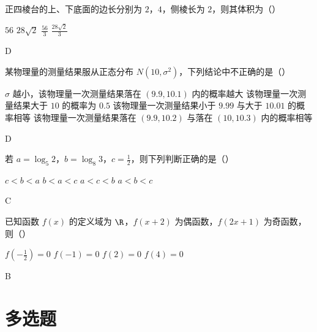 \begin{problem}
正四棱台的上、下底面的边长分别为 \(2\)，\(4\)，侧棱长为 \(2\)，则其体积为（\quad）

\choices
    {\(56\)}
    {\(28\sqrt2\)}
    {\(\frac{56}{3}\)}
    {\(\frac{28\sqrt2}{3}\)}

\begin{answer}
D
\end{answer}
\end{problem}


\begin{problem}
某物理量的测量结果服从正态分布 \(N\left( 10,\sigma^2 \right)\)，下列结论中不正确的是（\quad）

\choices
    {\(\sigma\) 越小，该物理量一次测量结果落在 \(\left( 9.9,10.1 \right)\) 内的概率越大}
    {该物理量一次测量结果大于 \(10\) 的概率为 \(0.5\)}
    {该物理量一次测量结果小于 \(9.99\) 与大于 \(10.01\) 的概率相等}
    {该物理量一次测量结果落在 \(\left( 9.9,10.2 \right)\) 与落在 \(\left( 10,10.3 \right)\) 内的概率相等}

\begin{answer}
D
\end{answer}
\end{problem}


\begin{problem}
若 \(a=\log_5 2\)，\(b=\log_8 3\)，\(c=\frac12\)，则下列判断正确的是（\quad）

\choices
    {\(c<b<a\)}
    {\(b<a<c\)}
    {\(a<c<b\)}
    {\(a<b<c\)}

\begin{answer}
C
\end{answer}
\end{problem}


\begin{problem}
已知函数 \(f\left( x \right)\) 的定义域为 \(\R\)，\(f\left( x+2 \right)\) 为偶函数，\(f\left( 2x+1 \right)\) 为奇函数，则（\quad）

\choices
    {\(f\left( -\frac12 \right)=0\)}
    {\(f\left( -1 \right)=0\)}
    {\(f\left( 2 \right)=0\)}
    {\(f\left( 4 \right)=0\)}

\begin{answer}
B
\end{answer}
\end{problem}

\section{多选题}

